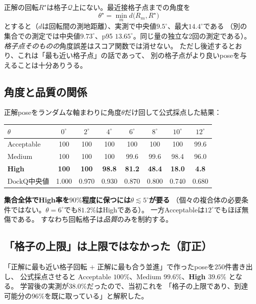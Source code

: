 \documentclass[11pt,a4paper]{article}
\newcommand{\dockq}{\mathrm{DockQ}}
\begin{document}
正解の回転$R^\star$は格子$\mathcal{Q}$上にない。最近接格子点までの角度を
\begin{equation}
  \theta^\star = \min_{m} d\bigl(R_m, R^\star\bigr)
\end{equation}
とすると（$d$は回転間の測地距離）、実測で中央値$9.5^\circ$、最大$14.4^\circ$である
（別の集合での測定では中央値$9.73^\circ$、p95 $13.65^\circ$。同じ量の独立な2回の測定である）。
\emph{格子点そのものの}角度誤差はスコア関数では消せない。
ただし後述するとおり、これは「最も近い格子点」の話であって、
別の格子点がより良いposeを与えることは十分ありうる。

\subsection{角度と品質の関係}

正解poseをランダムな軸まわりに角度$\theta$だけ回して公式採点した結果：

\begin{center}
\begin{tabular}{lccccccc}
\toprule
$\theta$ & $0^\circ$ & $2^\circ$ & $4^\circ$ & $6^\circ$ & $8^\circ$ & $10^\circ$ & $12^\circ$\\
\midrule
Acceptable & 100 & 100 & 100 & 100 & 100 & 100 & 99.6\\
Medium     & 100 & 100 & 100 & 99.6 & 99.6 & 98.4 & 96.0\\
\textbf{High} & \textbf{100} & \textbf{100} & \textbf{98.8} & \textbf{81.2} & \textbf{48.4} & \textbf{18.0} & \textbf{4.8}\\
$\dockq$中央値 & 1.000 & 0.970 & 0.930 & 0.870 & 0.800 & 0.740 & 0.680\\
\bottomrule
\end{tabular}
\end{center}

\textbf{集合全体でHigh率を$90\%$程度に保つには$\theta \lesssim 5^\circ$が要る}
（個々の複合体の必要条件ではない。$\theta = 6^\circ$でも$81.2\%$はHighである）。
一方Acceptableは$12^\circ$でもほぼ無傷である。
すなわち回転格子は\emph{品質}のみを制約する。

\subsection{「格子の上限」は上限ではなかった（訂正）}

「正解に最も近い格子回転 $+$ 正解に最も合う並進」で作ったposeを$250$件書き出し、
公式採点させると Acceptable $100\%$、Medium $99.6\%$、\textbf{High $39.6\%$} となる。
学習後の実測が$38.0\%$だったので、当初これを
「格子の上限であり、到達可能分の$96\%$を既に取っている」と解釈した。
\end{document}
